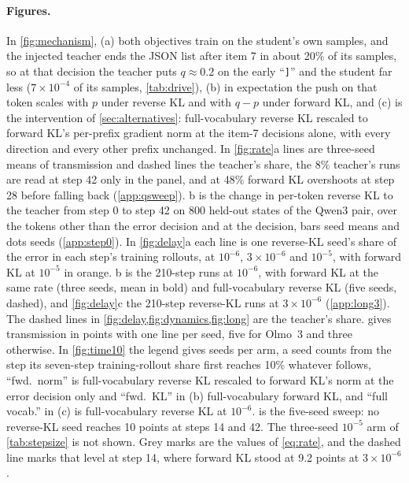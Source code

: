 \paragraph{Figures.}
In \cref{fig:mechanism}, (a) both objectives train on the student's own samples, and the injected teacher ends the JSON list after item 7 in about 20\% of its samples, so at that decision the teacher puts $q\approx0.2$ on the early ``\texttt{]}'' and the student far less ($7\times10^{-4}$ of its samples, \cref{tab:drive}), (b) in expectation the push on that token scales with $p$ under reverse KL and with $q-p$ under forward KL, and (c) is the intervention of \cref{sec:alternatives}: full-vocabulary reverse KL rescaled to forward KL's per-prefix gradient norm at the item-7 decisions alone, with every direction and every other prefix unchanged.
In \cref{fig:rate}a lines are three-seed means of transmission and dashed lines the teacher's share, the 8\% teacher's runs are read at step 42 only in the panel, and at 48\% forward KL overshoots at step 28 before falling back (\cref{app:qsweep}). b is the change in per-token reverse KL to the teacher from step 0 to step 42 on 800 held-out states of the Qwen3 pair, over the tokens other than the error decision and at the decision, bars seed means and dots seeds (\cref{app:step0}).
In \cref{fig:delay}a each line is one reverse-KL seed's share of the error in each step's training rollouts, at $10^{-6}$, $3\times10^{-6}$ and $10^{-5}$, with forward KL at $10^{-5}$ in orange. b is the 210-step runs at $10^{-6}$, with forward KL at the same rate (three seeds, mean in bold) and full-vocabulary reverse KL (five seeds, dashed), and \cref{fig:delay}c the 210-step reverse-KL runs at $3\times10^{-6}$ (\cref{app:long3}). The dashed lines in \cref{fig:delay,fig:dynamics,fig:long} are the teacher's share.
 gives transmission in points with one line per seed, five for Olmo~3 and three otherwise.
In \cref{fig:time10} the legend gives seeds per arm, a seed counts from the step its seven-step training-rollout share first reaches 10\% whatever follows, ``fwd.\ norm'' is full-vocabulary reverse KL rescaled to forward KL's norm at the error decision only and ``fwd.\ KL'' in (b) full-vocabulary forward KL, and ``full vocab.'' in (c) is full-vocabulary reverse KL at $10^{-6}$.  is the five-seed sweep: no reverse-KL seed reaches 10 points at steps 14 and 42. The three-seed $10^{-5}$ arm of \cref{tab:stepsize} is not shown. Grey marks are the values of \cref{eq:rate}, and the dashed line marks that level at step 14, where forward KL stood at 9.2 points at $3\times10^{-6}$.
